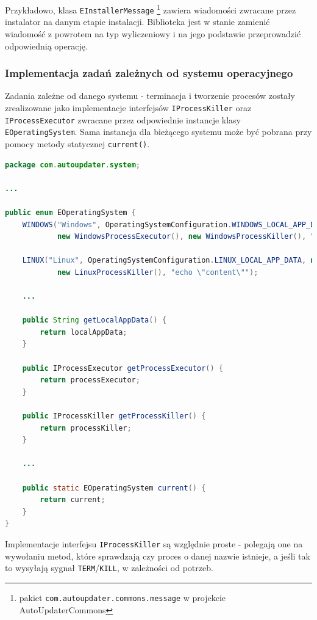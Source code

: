 \documentclass[polish,12pt,titlepage]{article}
\begin{document}
Przykładowo, klasa \texttt{EInstallerMessage} \footnote{pakiet
\texttt{com.autoupdater.commons.message} w projekcie AutoUpdaterCommons}
zawiera wiadomości zwracane przez instalator na danym etapie instalacji.
Biblioteka jest w stanie zamienić wiadomość z powrotem na typ wyliczeniowy i
na jego podstawie przeprowadzić odpowiednią operację.

\subsubsection{Implementacja zadań zależnych od systemu operacyjnego}

Zadania zależne od danego systemu - terminacja i tworzenie procesów zostały
zrealizowane jako implementacje interfejsów \texttt{IProcessKiller} oraz
\texttt{IProcessExecutor} zwracane przez odpowiednie instancje klasy
\texttt{EOperatingSystem}. Sama instancja dla bieżącego systemu może być
pobrana przy pomocy metody statycznej \texttt{current()}.

\begin{lstlisting}[language=Java, frame=lines, numberstyle=\tiny,
stepnumber=5, caption=Implementacja \texttt{EOperatingSystem}., firstnumber=1]
package com.autoupdater.system;

...

public enum EOperatingSystem {
    WINDOWS("Windows", OperatingSystemConfiguration.WINDOWS_LOCAL_APP_DATA,
            new WindowsProcessExecutor(), new WindowsProcessKiller(), "tasklist"),

    LINUX("Linux", OperatingSystemConfiguration.LINUX_LOCAL_APP_DATA, new LinuxProcessExecutor(),
            new LinuxProcessKiller(), "echo \"content\"");

    ...

    public String getLocalAppData() {
        return localAppData;
    }

    public IProcessExecutor getProcessExecutor() {
        return processExecutor;
    }

    public IProcessKiller getProcessKiller() {
        return processKiller;
    }

    ...

    public static EOperatingSystem current() {
        return current;
    }
}
\end{lstlisting}

Implementacje interfejsu \texttt{IProcessKiller} są względnie proste -
polegają one na wywołaniu metod, które sprawdzają czy proces o danej nazwie
istnieje, a jeśli tak to wysyłają sygnał \texttt{TERM}/\texttt{KILL}, w
zależności od potrzeb.
\end{document}
